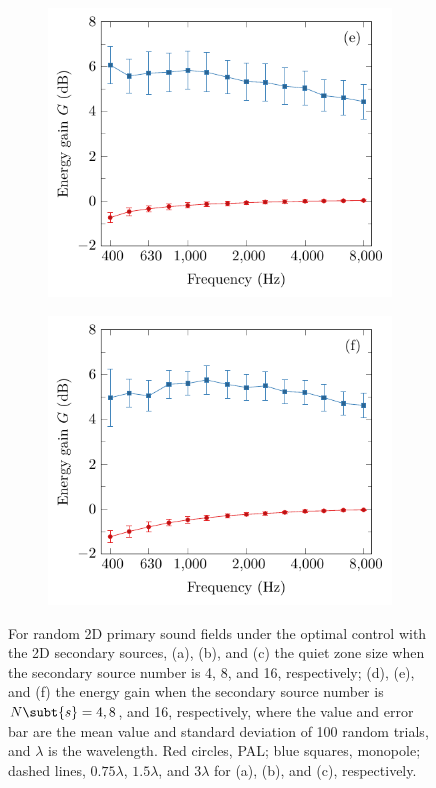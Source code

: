 \begin{figure}[!htb]
\begin{subfigure}{0.32\textwidth}
        \includegraphics[width = \textwidth]{fig/200331A_gain_v2}
    \end{subfigure}
    \begin{subfigure}{0.32\textwidth}
        \centering
        \includegraphics[width = \textwidth]{fig/200404B_gain_v2}
    \end{subfigure}
    \caption{For random 2D primary sound fields under the optimal control with the 2D secondary sources, (a), (b), and (c) the quiet zone size when the secondary source number is 4, 8, and 16, respectively; (d), (e), and (f) the energy gain when the secondary source number is $N\subt{s} = 4, 8$, and 16, respectively, where the value and error bar are the mean value and standard deviation of 100 random trials, and $\lambda$ is the wavelength. Red circles, PAL; blue squares, monopole; dashed lines, $0.75\lambda$, $1.5\lambda$, and $3\lambda$ for (a), (b), and (c), respectively.}
    \label{fig:ancpalqz:rand:qz_eg}
\end{figure}

